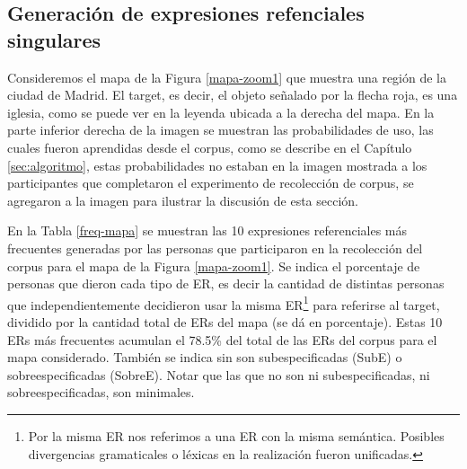 %


\subsection{Generaci\'on de expresiones refenciales singulares}
\label{sec:sinzoom}

Consideremos el mapa de la Figura \ref{mapa-zoom1} que muestra una regi\'on de la ciudad de Madrid. El target, es decir, el objeto se\~nalado por la flecha roja, es una iglesia, como se puede ver en la leyenda ubicada a la derecha del mapa. En la parte inferior derecha de la imagen se muestran las probabilidades de uso, las cuales fueron aprendidas desde el corpus, como se describe en el Cap\'itulo \ref{sec:algoritmo}, estas probabilidades no estaban en la imagen mostrada a los participantes que completaron el experimento de recolecci\'on de corpus, se agregaron a la imagen para ilustrar la discusi\'on de esta secci\'on.

En la Tabla \ref{freq-mapa} se muestran las 10 expresiones referenciales m\'as frecuentes generadas por las personas que participaron 
en la recolecci\'on del corpus para el mapa de la Figura \ref{mapa-zoom1}. Se indica el porcentaje de personas que dieron cada tipo de ER, es decir la cantidad de distintas personas que independientemente decidieron usar la misma ER\footnote{Por la misma ER nos referimos a una ER con la misma sem\'antica. Posibles divergencias gramaticales o l\'exicas en la realizaci\'on fueron unificadas.} para referirse al target, dividido por la cantidad total de ERs del mapa (se d\'a en porcentaje). Estas 10 ERs m\'as frecuentes acumulan el 78.5\% del total de las ERs del corpus para el mapa considerado. Tambi\'en se indica sin son subespecificadas (SubE) o sobreespecificadas (SobreE). Notar que las que no son ni subespecificadas, ni sobreespecificadas, son minimales.\\



